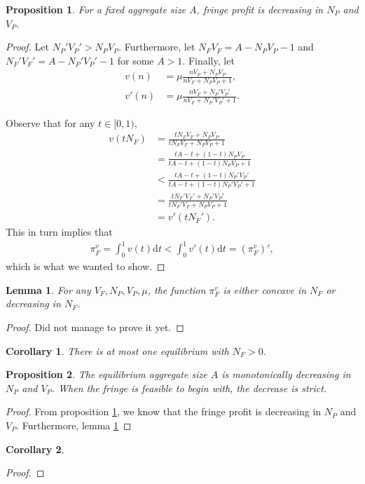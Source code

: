 \documentclass[a4paper]{article}
\newtheorem{proposition}{Proposition}
\newtheorem{corollary}{Corollary}
\newtheorem{lemma}{Lemma}
\newcommand{\dt}{\mathrm{d}t}
\begin{document}
\begin{proposition}
    \label{prop:fringe_profit_decreasing_in_N_P}
    For a fixed aggregate size $A$, fringe profit is decreasing in $N_P$ and $V_P$.
\end{proposition}
\begin{proof}
    Let $N_P' V_P' > N_P V_P$.
    Furthermore, let $N_F V_F = A - N_P V_P - 1$ and $N_F' V_F' = A - N_P' V_P' - 1$ for some $A > 1$.
    Finally, let
    \begin{align*}
        v(n) &= \mu \frac{n V_F + N_P V_P}{n V_F + N_P V_P + 1}, \\
        v'(n) &= \mu \frac{n V_F + N_P' V_P'}{n V_F + N_P' V_P' + 1}.
    \end{align*}

    Observe that for any $t \in [0, 1)$,
    \begin{align*}
        v(tN_F) &= \frac{t N_F V_F + N_P V_P}{t N_F V_F + N_P V_P + 1} \\
                &= \frac{tA - t + (1 - t) N_P V_P}{tA - t + (1 - t) N_P V_P + 1} \\
                &< \frac{tA - t + (1 - t) N_P' V_P'}{tA - t + (1 - t) N_P' V_P' + 1} \\
                &= \frac{t N_F' V_F' + N_P' V_P'}{t N_F' V_F + N_P V_P + 1} \\
                &= v'(tN_F').
    \end{align*}
    This in turn implies that
    \begin{align*}
        \pi_F^v = \int_0^1 v(t) \dt < \int_0^1 v'(t) \dt = (\pi_F^v)',
    \end{align*}
    which is what we wanted to show.

\end{proof}


\begin{lemma}
    \label{lem:shape_of_pi_F}
    For any $V_F, N_P, V_P, \mu$, the function $\pi^v_F$ is either concave in $N_F$ or decreasing in $N_F$.
\end{lemma}
\begin{proof}
    Did not manage to prove it yet.
\end{proof}

\begin{corollary}
    \label{cor:unique_eq}
    There is at most one equilibrium with $N_F > 0$.
\end{corollary}

\begin{proposition}
    \label{prop:A_decreasing_in_N_P}
    The equilibrium aggregate size $A$ is monotonically decreasing in $N_P$ and $V_P$. When the fringe is feasible to begin with, the decrease is strict.
\end{proposition}
\begin{proof}
    From proposition \ref{prop:fringe_profit_decreasing_in_N_P}, we know that the fringe profit is decreasing in $N_P$ and $V_P$.
    Furthermore, lemma \ref{lem:shape_of_pi_F}
\end{proof}


\begin{corollary}
    \label{consumer_welfare_decreasing_in_N_P}
\end{corollary}
\begin{proof}
    
\end{proof}
\end{document}
